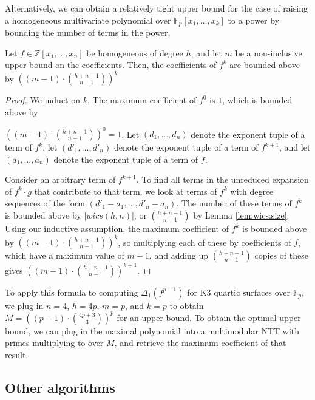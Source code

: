 Alternatively, we can obtain a relatively tight upper 
bound for the case of raising a homogeneous multivariate 
polynomial over $\mathbb{F}_p[x_1, \dots , x_k]$ to a power
by bounding the number of terms in the power. 

\begin{thm}
    Let $f \in \mathbb{Z}[x_1, \dots, x_n]$ be homogeneous of degree \(h\), 
    and let $m$ be a non-inclusive upper bound on the coefficients. 
    Then, the coefficients of $f ^ k$ are bounded above by 
    $\left((m - 1) \cdot \binom{h + n - 1}{n - 1}\right)^ k$
\end{thm}

\begin{proof}
    We induct on $k$. The maximum coefficient 
    of $f^0$ is $1$, which is bounded above by 
    
    \noindent$\left((m - 1) \cdot \binom{h + n - 1}{n - 1}\right)^ 0 = 1$.
    Let $(d_1, \dots , d_n)$ denote the exponent 
    tuple of a term of $f^k$, let $(d'_1, \dots , d'_n)$ 
    denote the exponent tuple of a term of 
    $f^{k + 1}$, and let $(a_1, \dots , a_n)$ 
    denote the exponent tuple of a term of $f$.

    Consider an arbitrary term of $f^{k + 1}$. 
    To find all terms in the unreduced 
    expansion of $f^k \cdot g$ that contribute 
    to that term, we look at 
    terms of $f^k$ with degree sequences of 
    the form $(d'_1 - a_1, \dots , d'_n - a_n)$. 
    The number of these terms of $f^k$ is bounded 
    above by $|wics(h, n)|$, or $\binom{h + n - 1}{n - 1}$ 
    by Lemma \ref{lem:wics:size}. Using our 
    inductive assumption, the maximum coefficient 
    of $f^k$ is bounded above by 
    $\left((m - 1) \cdot \binom{h + n - 1}{n - 1}\right)^ k$, 
    so multiplying each of these by coefficients 
    of $f$, which have a maximum value of 
    $m - 1$, and adding up $\binom{h + n - 1}{n - 1}$ 
    copies of these gives 
    $\left((m - 1) \cdot \binom{h + n - 1}{n - 1}\right)^{k + 1}$.
\end{proof}

To apply this formula to computing $\Delta_1(f^{p - 1})$ for K3 
quartic surfaces over $\mathbb{F}_p$, we plug in $n = 4$, $h = 4p$, $m = p$, 
and $k = p$ to obtain $M = \left((p - 1) \cdot \binom{4p + 3}{3}\right)^ p$
for an upper bound. To obtain the optimal upper bound, we can plug in the
maximal polynomial into a multimodular NTT with primes multiplying to over $M$,
and retrieve the maximum coefficient of that result.

\subsection{Other algorithms} \label{sec:poly:other}

